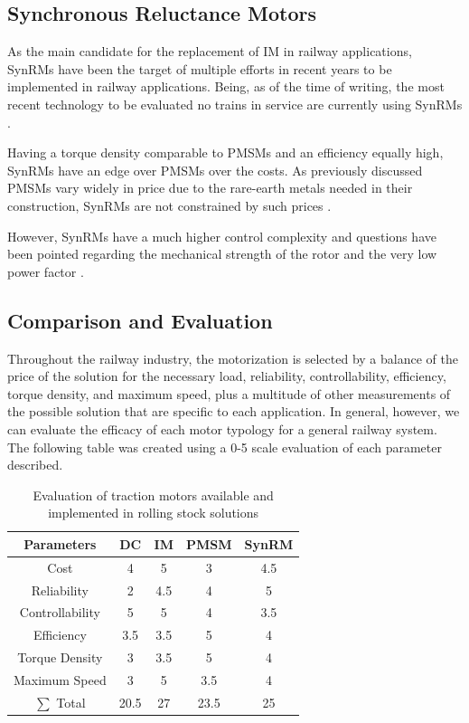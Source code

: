 \subsection{Synchronous Reluctance Motors}
As the main candidate for the replacement of IM in railway applications, SynRMs have been the target of multiple efforts in recent years to be implemented in railway applications. Being, as of the time of writing, the most recent technology to be evaluated no trains in service are currently using SynRMs \cite{Motor-SOTA}.

Having a torque density comparable to PMSMs and an efficiency equally high, SynRMs have an edge over PMSMs over the costs. As previously discussed PMSMs vary widely in price due to the rare-earth metals needed in their construction, SynRMs are not constrained by such prices \cite{MainSOTA}.

However, SynRMs have a much higher control complexity and questions have been pointed regarding the mechanical strength of the rotor and the very low power factor \cite{Motor-SOTA}.

\subsection{Comparison and Evaluation}
Throughout the railway industry, the motorization is selected by a balance of the price of the solution for the necessary load, reliability, controllability, efficiency, torque density, and maximum speed, plus a multitude of other measurements of the possible solution that are specific to each application. In general, however, we can evaluate the efficacy of each motor typology for a general railway system. The following table was created \cite{MainSOTA} using a 0-5 scale evaluation of each parameter described. 

\begin{table}[ht]

    \centering
    \caption{Evaluation of traction motors available and implemented in rolling stock solutions \cite{MainSOTA}}
    \begin{tabular}{c|c c c c}
        \hline\hline
        Parameters     & DC & IM & PMSM & SynRM \\
        \hline
         Cost & 4 & 5 & 3 & 4.5\\
         Reliability & 2 & 4.5 & 4 & 5\\
         Controllability & 5 & 5 & 4 & 3.5\\
         Efficiency & 3.5 & 3.5 & 5 & 4\\
         Torque Density & 3 & 3.5 & 5 & 4\\
         Maximum Speed & 3 & 5 & 3.5 & 4\\
         \hline
         $\sum $ Total & 20.5 & 27 & 23.5 & 25\\
         \hline\hline
    \end{tabular}
    
    \label{tab:MotorEval}
\end{table}


